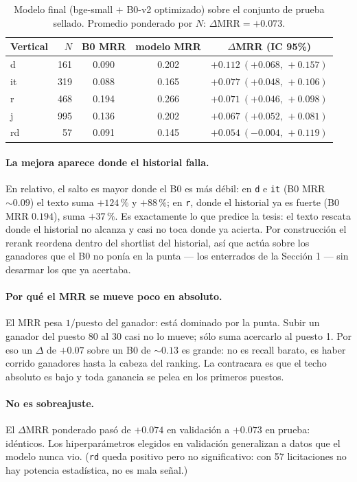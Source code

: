 \documentclass[11pt]{article}
\begin{document}
\begin{table}[h]
\centering
\begin{tabular}{lrccc}
\toprule
Vertical & $N$ & B0 MRR & modelo MRR & $\Delta$MRR (IC 95\%) \\
\midrule
d  & 161 & 0.090 & 0.202 & $+0.112\ (+0.068,\,+0.157)$ \\
it & 319 & 0.088 & 0.165 & $+0.077\ (+0.048,\,+0.106)$ \\
r  & 468 & 0.194 & 0.266 & $+0.071\ (+0.046,\,+0.098)$ \\
j  & 995 & 0.136 & 0.202 & $+0.067\ (+0.052,\,+0.081)$ \\
rd & 57  & 0.091 & 0.145 & $+0.054\ (-0.004,\,+0.119)$ \\
\bottomrule
\end{tabular}
\vspace{-2pt}
\caption{Modelo final (bge-small $+$ B0-v2 optimizado) sobre el conjunto de prueba sellado.
Promedio ponderado por $N$: $\Delta\text{MRR}=+0.073$.}
\end{table}

\paragraph{La mejora aparece donde el historial falla.} En relativo, el salto es mayor donde el B0
es más débil: en \texttt{d} e \texttt{it} (B0 MRR $\sim0.09$) el texto suma $+124\,\%$ y $+88\,\%$;
en \texttt{r}, donde el historial ya es fuerte (B0 MRR $0.194$), suma $+37\,\%$. Es exactamente lo
que predice la tesis: el texto rescata donde el historial no alcanza y casi no toca donde ya
acierta. Por construcción el rerank reordena dentro del shortlist del historial, así que actúa sobre
los ganadores que el B0 no ponía en la punta --- los enterrados de la Sección 1 --- sin desarmar los
que ya acertaba.

\paragraph{Por qué el MRR se mueve poco en absoluto.} El MRR pesa $1/\text{puesto}$ del ganador:
está dominado por la punta. Subir un ganador del puesto 80 al 30 casi no lo mueve; sólo suma
acercarlo al puesto 1. Por eso un $\Delta$ de $+0.07$ sobre un B0 de $\sim0.13$ es grande: no es
recall barato, es haber corrido ganadores hasta la cabeza del ranking. La contracara es que el techo
absoluto es bajo y toda ganancia se pelea en los primeros puestos.

\paragraph{No es sobreajuste.} El $\Delta$MRR ponderado pasó de $+0.074$ en validación a $+0.073$ en
prueba: idénticos. Los hiperparámetros elegidos en validación generalizan a datos que el modelo
nunca vio. (\texttt{rd} queda positivo pero no significativo: con 57 licitaciones no hay potencia
estadística, no es mala señal.)
\end{document}
